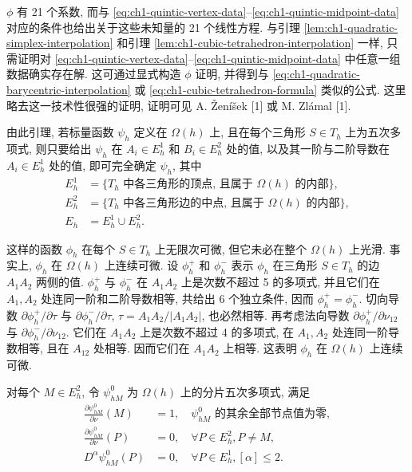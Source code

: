 \begin{Proof}[证明原理]
$\phi$ 有 21 个系数, 而与 \eqref{eq:ch1-quintic-vertex-data}–\eqref{eq:ch1-quintic-midpoint-data} 对应的条件也给出关于这些未知量的 21 个线性方程. 与引理 \ref{lem:ch1-quadratic-simplex-interpolation} 和引理 \ref{lem:ch1-cubic-tetrahedron-interpolation} 一样, 只需证明对 \eqref{eq:ch1-quintic-vertex-data}–\eqref{eq:ch1-quintic-midpoint-data} 中任意一组数据确实存在解. 这可通过显式构造 $\phi$ 证明, 并得到与 \eqref{eq:ch1-quadratic-barycentric-interpolation} 或 \eqref{eq:ch1-cubic-tetrahedron-formula} 类似的公式. 这里略去这一技术性很强的证明, 证明可见 A. Ženíšek [1] 或 M. Zlámal [1].
\end{Proof}

由此引理, 若标量函数 $\psi_h$ 定义在 $\Omega(h)$ 上, 且在每个三角形 $S\in T_h$ 上为五次多项式, 则只要给出 $\psi_h$ 在 $A_i\in E_h^1$ 和 $B_i\in E_h^2$ 处的值, 以及其一阶与二阶导数在 $A_i\in E_h^1$ 处的值, 即可完全确定 $\psi_h$, 其中
\begin{equation}
\begin{aligned}
E_h^1&=\{T_h\text{ 中各三角形的顶点, 且属于 }\Omega(h)\text{ 的内部}\},\\
E_h^2&=\{T_h\text{ 中各三角形边的中点, 且属于 }\Omega(h)\text{ 的内部}\},\\
E_h&=E_h^1\cup E_h^2.
\end{aligned}
\label{eq:ch1-apx4-node-sets}
\end{equation}

这样的函数 $\phi_h$ 在每个 $S\in T_h$ 上无限次可微, 但它未必在整个 $\Omega(h)$ 上光滑. 事实上, $\phi_h$ 在 $\Omega(h)$ 上连续可微. 设 $\phi_h^+$ 和 $\phi_h^-$ 表示 $\phi_h$ 在三角形 $S\in T_h$ 的边 $A_1A_2$ 两侧的值. $\phi_h^+$ 与 $\phi_h^-$ 在 $A_1A_2$ 上是次数不超过 5 的多项式, 并且它们在 $A_1,A_2$ 处连同一阶和二阶导数相等, 共给出 6 个独立条件, 因而 $\phi_h^+=\phi_h^-$. 切向导数 $\partial\phi_h^+/\partial\tau$ 与 $\partial\phi_h^-/\partial\tau$, $\tau=A_1A_2/|A_1A_2|$, 也必然相等. 再考虑法向导数 $\partial\phi_h^+/\partial\nu_{12}$ 与 $\partial\phi_h^-/\partial\nu_{12}$. 它们在 $A_1A_2$ 上是次数不超过 4 的多项式, 在 $A_1,A_2$ 处连同一阶导数相等, 且在 $A_{12}$ 处相等. 因而它们在 $A_1A_2$ 上相等. 这表明 $\phi_h$ 在 $\Omega(h)$ 上连续可微.

对每个 $M\in E_h^2$, 令 $\psi_{hM}^0$ 为 $\Omega(h)$ 上的分片五次多项式, 满足
\begin{equation}
\begin{aligned}
\frac{\partial\psi_{hM}^0}{\partial\nu}(M)&=1,
\quad \psi_{hM}^0\text{ 的其余全部节点值为零},\\
\frac{\partial\psi_{hM}^0}{\partial\nu}(P)&=0,
\quad\forall P\in E_h^2, P\neq M,\\
D^\alpha\psi_{hM}^0(P)&=0,
\quad\forall P\in E_h^1, [\alpha]\leq2.
\end{aligned}
\label{eq:ch1-apx4-midpoint-basis}
\end{equation}

